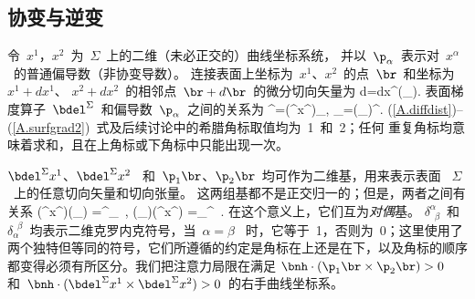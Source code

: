 \subsection{协变与逆变}
%
%

令~$x^1$，$x^2$~为~$\Sigma$~上的二维（未必正交的）曲线坐标系统，
并以~$\p_{\alpha}$~表示对~$x^{\alpha}$~的普通偏导数（非协变导数）。
连接表面上坐标为~$x^1$、$x^2$~的点~$\br$~和坐标为~$x^1+dx^1$、 $x^2+dx^2$~的相邻点~$\br+d\/\br$~的微分切向矢量为
\eq \label{A.diffdist}
d\/\br=dx^{\alpha}(\p_{\alpha}\br).
\en
表面梯度算子~$\bdel^{\Sigma}$~和偏导数~$\p_{\alpha}$~之间的关系为
\eq \label{A.surfgrad2}
\bdel^{\Sigma}=(\bdel^{\Sigma}x^{\alpha})\p_{\alpha},\qquad
\p_{\alpha}=(\p_{\alpha}\br)\cdot\bdel^{\Sigma}.
\en
(\ref{A.diffdist})--(\ref{A.surfgrad2})~式及后续讨论中的希腊角标取值均为~1~和~2；任何
重复角标均意味着求和，且在上角标或下角标中只能出现一次。

$\bdel^{\Sigma}x^1$、$\bdel^{\Sigma}x^2$~
和~$\p_1\br$、$\p_2\br$~均可作为二维基，用来表示表面~ $\Sigma$~上的任意切向矢量和切向张量。
这两组基都不是正交归一的；但是，两者之间有关系
\eq \label{A.dual}
(\bdel^{\Sigma}x^{\alpha})\cdot(\p_{\beta}\br)
=\delta^{\alpha}_{\,\,\,\beta},\qquad
(\p_{\alpha}\br)\cdot(\bdel^{\Sigma}x^{\beta})
=\delta_{\alpha}^{\,\,\,\beta}.
\en
在这个意义上，它们互为{\em 对偶\/}基。
%
%
$\delta^{\alpha}_{\,\,\,\beta}$~和~
$\delta_{\alpha}^{\,\,\,\beta}$~均表示二维克罗内克符号，当~$\alpha=\beta$~ 时，它等于~1，否则为~0；这里使用了两个独特但等同的符号，它们所遵循的约定是角标在上还是在下，以及角标的顺序都变得必须有所区分。我们把注意力局限在满足 
$\bnh\cdot(\p_1\br\times\p_2\br)>0$~
和~$\bnh\cdot(\bdel^{\Sigma}x^1
\times\bdel^{\Sigma}x^2)>0$~的右手曲线坐标系。

